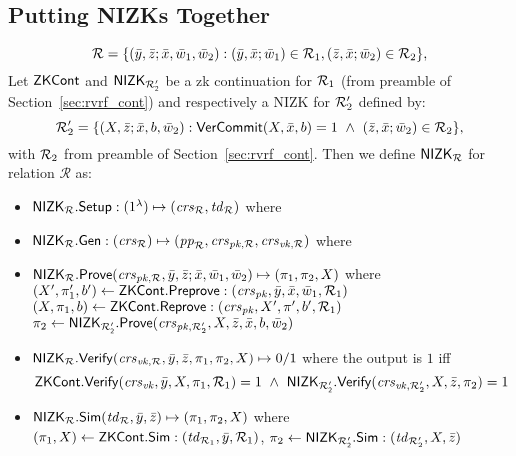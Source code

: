 \subsection{Putting NIZKs Together}
$$\rel = \{(\bary, \barz; \barx, \baromega_1, \baromega_2):  (\bary, \barx; \baromega_1) \in \relone, (\barz, \barx; \baromega_2) \in \reltwo \},$$
Let $\ZKCont$ and $\nizktwo$ be a zk continuation for $\relone$ (from preamble of Section~\ref{sec:rvrf_cont}) and respectively a NIZK 
for $\reltwo'$ defined by:
$$\reltwo' = \{(X, \barz; \barx, b, \baromega_2): \VerifyCom(X, \barx, b) =1 \ \wedge \ (\barz, \barx; \baromega_2) \in \reltwo \},$$
\noindent with $\reltwo$ from preamble of Section~\ref{sec:rvrf_cont}. Then we define $\nizkR$ for relation $\mathcal{R}$ as:
\begin{itemize}
\item $\nizkR.\Setup: (1^{\lambda}) \mapsto (\crsR, \twR)$ where
\item $\nizkR.\Gen: (\crsR) \mapsto (\ppR, \crspkR, \crsvkR)$ where
\item $\nizkR.\Prove(\crspkR,\bary, \barz; \barx, \baromega_1, \baromega_2 ) \mapsto (\pi_1, \pi_2, X)$ where \\
$(X', \pi'_1, b')\leftarrow \ZKCont.\Preprove:(\crspk, \bar{y}, \bar{x}, \baromega_1, \relone)$ \\
$(X, \pi_1, b) \leftarrow \ZKCont.\Reprove: (\crspk, X', \pi', b', \relone)$ \\
$ \pi_2 \leftarrow \nizktwo.\Prove(\crspktwo, X, \barz, \barx, b, \baromega_2)$ 
\item $\nizkR.\Verify(\crsvkR,\bary, \barz, \pi_1, \pi_2, X) \mapsto 0/1$ where the output is $1$ iff 
$$\ZKCont.\Verify(\crsvk, \bar{y}, X, \pi_1, \relone) = 1 \  \wedge \ \nizktwo.\Verify(\crsvktwo, X, \barz, \pi_2) =1$$ 
\item $\nizkR.\Sim(\twR, \bary, \barz) \mapsto (\pi_1, \pi_2, X)$ where \\
$(\pi_1, X) \leftarrow \ZKCont.\Sim: (\twone, \bary, \relone)$, $\pi_2 \leftarrow \nizktwo.\Sim: (\twtwo, X, \barz)$ 
 
\end{itemize}


